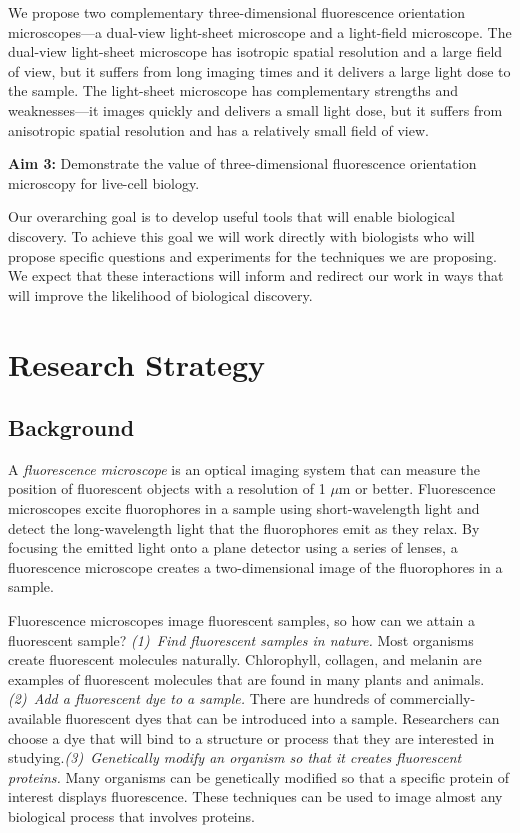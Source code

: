 \documentclass[12pt]{article}
\begin{document}
We propose two complementary three-dimensional fluorescence orientation
microscopes---a dual-view light-sheet microscope and a light-field
microscope. The dual-view light-sheet microscope has isotropic spatial
resolution and a large field of view, but it suffers from long imaging times and
it delivers a large light dose to the sample. The light-sheet microscope has
complementary strengths and weaknesses---it images quickly and delivers a small
light dose, but it suffers from anisotropic spatial resolution and has a
relatively small field of view.

\noindent\textbf{Aim 3:} Demonstrate the value of three-dimensional fluorescence orientation
microscopy for live-cell biology.

Our overarching goal is to develop useful tools that will enable biological
discovery. To achieve this goal we will work directly with biologists who will
propose specific questions and experiments for the techniques we are
proposing. We expect that these interactions will inform and redirect our work
in ways that will improve the likelihood of biological discovery.

\pagebreak

\section*{Research Strategy}
\subsection*{Background}
A \textit{fluorescence microscope} is an optical imaging system that can measure
the position of fluorescent objects with a resolution of 1 $\mu$m or better.
Fluorescence microscopes excite fluorophores in a sample using short-wavelength
light and detect the long-wavelength light that the fluorophores emit as they
relax. By focusing the emitted light onto a plane detector using a series of
lenses, a fluorescence microscope creates a two-dimensional image of the
fluorophores in a sample.

Fluorescence microscopes image fluorescent samples, so how can we attain a
fluorescent sample? \textit{(1)~Find fluorescent samples in nature.} Most
organisms create fluorescent molecules naturally. Chlorophyll, collagen, and
melanin are examples of fluorescent molecules that are found in many plants and
animals. \textit{(2)~Add a fluorescent dye to a sample.}  There are hundreds of
commercially-available fluorescent dyes that can be introduced into a
sample. Researchers can choose a dye that will bind to a structure or process
that they are interested in studying.\hspace{0.4em}\textit{(3)~Genetically
  modify an organism so that it creates fluorescent proteins.} Many organisms
can be genetically modified so that a specific protein of interest displays
fluorescence. These techniques can be used to image almost any biological
process that involves proteins.
\end{document}
